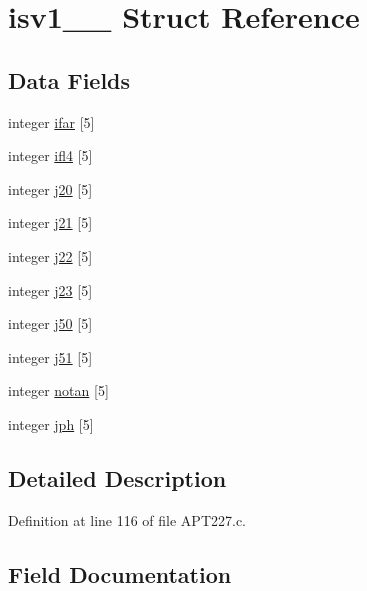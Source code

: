 \hypertarget{structisv1__1__}{}\section{isv1\+\_\+\_\+ Struct Reference}
\label{structisv1__1__}
\subsection*{Data Fields}
\begin{DoxyCompactItemize}
\item 
integer \hyperlink{structisv1__1___a6c06e352e7758bbb3a871de7db0337f9}{ifar} \mbox{[}5\mbox{]}
\item 
integer \hyperlink{structisv1__1___aa428b6773abd501a0dd6db7ebd1f5e34}{ifl4} \mbox{[}5\mbox{]}
\item 
integer \hyperlink{structisv1__1___a322fa494fd3c26d57e30a0a4f659eff9}{j20} \mbox{[}5\mbox{]}
\item 
integer \hyperlink{structisv1__1___ac4cfebba4c2bc9e83d7b94d638755b06}{j21} \mbox{[}5\mbox{]}
\item 
integer \hyperlink{structisv1__1___af6d64208f7cc0a693ccc42917bf832cd}{j22} \mbox{[}5\mbox{]}
\item 
integer \hyperlink{structisv1__1___a0bb1aacdec3d08893d8c5f3eda4e6336}{j23} \mbox{[}5\mbox{]}
\item 
integer \hyperlink{structisv1__1___a2e8005681f2327331cabcc7934518cc3}{j50} \mbox{[}5\mbox{]}
\item 
integer \hyperlink{structisv1__1___aaf07f7705181ca3a63c970978de75ded}{j51} \mbox{[}5\mbox{]}
\item 
integer \hyperlink{structisv1__1___a1a7c5fc76d20170f74375b1ecd47183f}{notan} \mbox{[}5\mbox{]}
\item 
integer \hyperlink{structisv1__1___a6e3511a2de91294c859989060309b79e}{jph} \mbox{[}5\mbox{]}
\end{DoxyCompactItemize}


\subsection{Detailed Description}


Definition at line 116 of file A\+P\+T227.\+c.



\subsection{Field Documentation}
